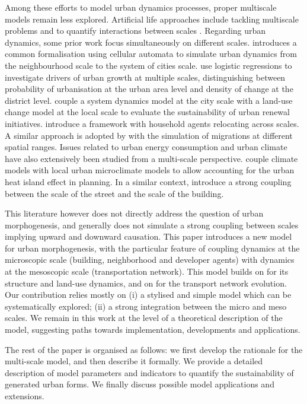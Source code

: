 \documentclass[letterpaper]{article}
\begin{document}
Among these efforts to model urban dynamics processes, proper multiscale models remain less explored. Artificial life approaches include tackling multiscale problems and to quantify interactions between scales \citep{seth2010measuring}. Regarding urban dynamics, some prior work focus simultaneously on different scales. \cite{batty2005agents} introduces a common formalisation using cellular automata to simulate urban dynamics from the neighbourhood scale to the system of cities scale. \cite{cheng2003modelling} use logistic regressions to investigate drivers of urban growth at multiple scales, distinguishing between probability of urbanisation at the urban area level and density of change at the district level. \cite{zheng2017decision} couple a system dynamics model at the city scale with a land-use change model at the local scale to evaluate the sustainability of urban renewal initiatives. \cite{torrens2012polyspatial} introduce a framework with household agents relocating across scales. A similar approach is adopted by \cite{murcio2015urban} with the simulation of migrations at different spatial ranges. Issues related to urban energy consumption and urban climate have also extensively been studied from a multi-scale perspective. \cite{lim2017multi} couple climate models with local urban microclimate models to allow accounting for the urban heat island effect in planning. In a similar context, \cite{wong2021integrated} introduce a strong coupling between the scale of the street and the scale of the building.


This literature however does not directly address the question of urban morphogenesis,  and generally does not simulate a strong coupling between scales implying upward and downward causation. This paper introduces a new model for urban morphogenesis, with the particular feature of coupling dynamics at the microscopic scale (building, neighborhood and developer agents) with dynamics at the mesoscopic scale (transportation network). This model builds on \citep{raimbault2014hybrid} for its structure and land-use dynamics, and on \citep{raimbault2021introducing} for the transport network evolution. Our contribution relies mostly on (i) a stylised and simple model which can be systematically explored; (ii) a strong integration between the micro and meso scales. We remain in this work at the level of a theoretical description of the model, suggesting paths towards implementation, developments and applications.

The rest of the paper is organised as follows: we first develop the rationale for the multi-scale model, and then describe it formally. We provide a detailed description of model parameters and indicators to quantify the sustainability of generated urban forms. We finally discuss possible model applications and extensions.
\end{document}
